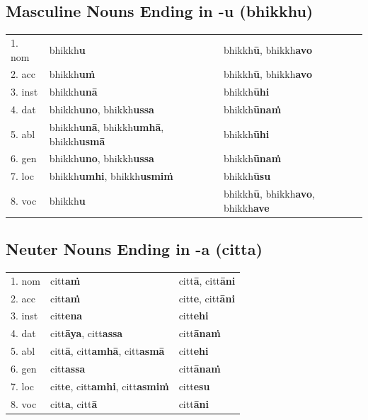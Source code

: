 \documentclass[11pt,oneside]{memoir}
\begin{document}
\subsection{Masculine Nouns Ending in -u (bhikkhu)}
\label{sec:org568c3ac}

\begin{center}
\begin{tabular}{lll}
1. nom & bhikkh\textbf{u} & bhikkh\textbf{ū}, bhikkh\textbf{avo}\\
2. acc & bhikkh\textbf{uṁ} & bhikkh\textbf{ū}, bhikkh\textbf{avo}\\
3. inst & bhikkh\textbf{unā} & bhikkh\textbf{ūhi}\\
4. dat & bhikkh\textbf{uno}, bhikkh\textbf{ussa} & bhikkh\textbf{ūnaṁ}\\
5. abl & bhikkh\textbf{unā}, bhikkh\textbf{umhā}, bhikkh\textbf{usmā} & bhikkh\textbf{ūhi}\\
6. gen & bhikkh\textbf{uno}, bhikkh\textbf{ussa} & bhikkh\textbf{ūnaṁ}\\
7. loc & bhikkh\textbf{umhi}, bhikkh\textbf{usmiṁ} & bhikkh\textbf{ūsu}\\
8. voc & bhikkh\textbf{u} & bhikkh\textbf{ū}, bhikkh\textbf{avo}, bhikkh\textbf{ave}\\
\end{tabular}
\end{center}
\subsection{Neuter Nouns Ending in -a (citta)}
\label{sec:orge03902f}

\begin{center}
\begin{tabular}{lll}
1. nom & citt\textbf{aṁ} & citt\textbf{ā}, citt\textbf{āni}\\
2. acc & citt\textbf{aṁ} & citt\textbf{e}, citt\textbf{āni}\\
3. inst & citt\textbf{ena} & citt\textbf{ehi}\\
4. dat & citt\textbf{āya}, citt\textbf{assa} & citt\textbf{ānaṁ}\\
5. abl & citt\textbf{ā}, citt\textbf{amhā}, citt\textbf{asmā} & citt\textbf{ehi}\\
6. gen & citt\textbf{assa} & citt\textbf{ānaṁ}\\
7. loc & citt\textbf{e}, citt\textbf{amhi}, citt\textbf{asmiṁ} & citt\textbf{esu}\\
8. voc & citt\textbf{a}, citt\textbf{ā} & citt\textbf{āni}\\
\end{tabular}
\end{center}
\end{document}
